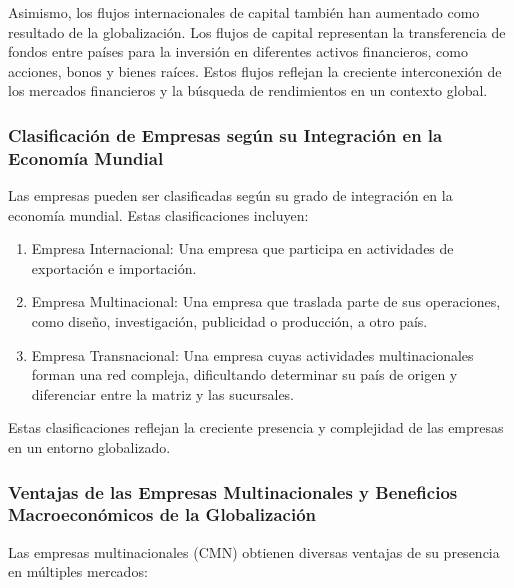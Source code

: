 \documentclass[
  a4paper,
]{article}
\providecommand{\tightlist}{%
  \setlength{\itemsep}{0pt}\setlength{\parskip}{0pt}}\usepackage{longtable,booktabs,array}
\begin{document}
Asimismo, los flujos internacionales de capital también han aumentado
como resultado de la globalización. Los flujos de capital representan la
transferencia de fondos entre países para la inversión en diferentes
activos financieros, como acciones, bonos y bienes raíces. Estos flujos
reflejan la creciente interconexión de los mercados financieros y la
búsqueda de rendimientos en un contexto global.

\hypertarget{clasificaciuxf3n-de-empresas-seguxfan-su-integraciuxf3n-en-la-economuxeda-mundial}{%
\subsubsection{Clasificación de Empresas según su Integración en la
Economía
Mundial}\label{clasificaciuxf3n-de-empresas-seguxfan-su-integraciuxf3n-en-la-economuxeda-mundial}}

Las empresas pueden ser clasificadas según su grado de integración en la
economía mundial. Estas clasificaciones incluyen:

\begin{enumerate}
\def\labelenumi{\arabic{enumi}.}
\tightlist
\item
  Empresa Internacional: Una empresa que participa en actividades de
  exportación e importación.
\item
  Empresa Multinacional: Una empresa que traslada parte de sus
  operaciones, como diseño, investigación, publicidad o producción, a
  otro país.
\item
  Empresa Transnacional: Una empresa cuyas actividades multinacionales
  forman una red compleja, dificultando determinar su país de origen y
  diferenciar entre la matriz y las sucursales.
\end{enumerate}

Estas clasificaciones reflejan la creciente presencia y complejidad de
las empresas en un entorno globalizado.

\hypertarget{ventajas-de-las-empresas-multinacionales-y-beneficios-macroeconuxf3micos-de-la-globalizaciuxf3n}{%
\subsubsection{Ventajas de las Empresas Multinacionales y Beneficios
Macroeconómicos de la
Globalización}\label{ventajas-de-las-empresas-multinacionales-y-beneficios-macroeconuxf3micos-de-la-globalizaciuxf3n}}

Las empresas multinacionales (CMN) obtienen diversas ventajas de su
presencia en múltiples mercados:
\end{document}
